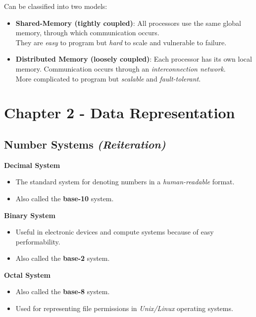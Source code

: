 \documentclass[12pt, letterpaper]{article}
\begin{document}
\begin{itemize}
        Can be classified into two models:
        \begin{itemize}
            \item \textbf{Shared-Memory (tightly coupled)}: All processors use the same global memory, through which communication occurs.\\
                They are \textit{easy} to program but \textit{hard} to scale and vulnerable to failure.
            \item \textbf{Distributed Memory (loosely coupled)}: Each processor has its own local memory. Communication occurs through an \textit{interconnection network}.\\
                More complicated to program but \textit{scalable} and \textit{fault-tolerant}.
        \end{itemize}
\end{itemize}

\section*{Chapter 2 - Data Representation}

\subsection*{Number Systems \textit{(Reiteration)}}

\textbf{Decimal System}

\begin{itemize}
    \item The standard system for denoting numbers in a \textit{human-readable} format.
    \item Also called the \textbf{base-10} system.
\end{itemize}

\textbf{Binary System}

\begin{itemize}
    \item Useful in electronic devices and compute systems because of easy performability.
    \item Also called the \textbf{base-2} system.
\end{itemize}

\textbf{Octal System}

\begin{itemize}
    \item Also called the \textbf{base-8} system.
    \item Used for representing file permissions in \textit{Unix/Linux} operating systems.
\end{itemize}
\end{document}
